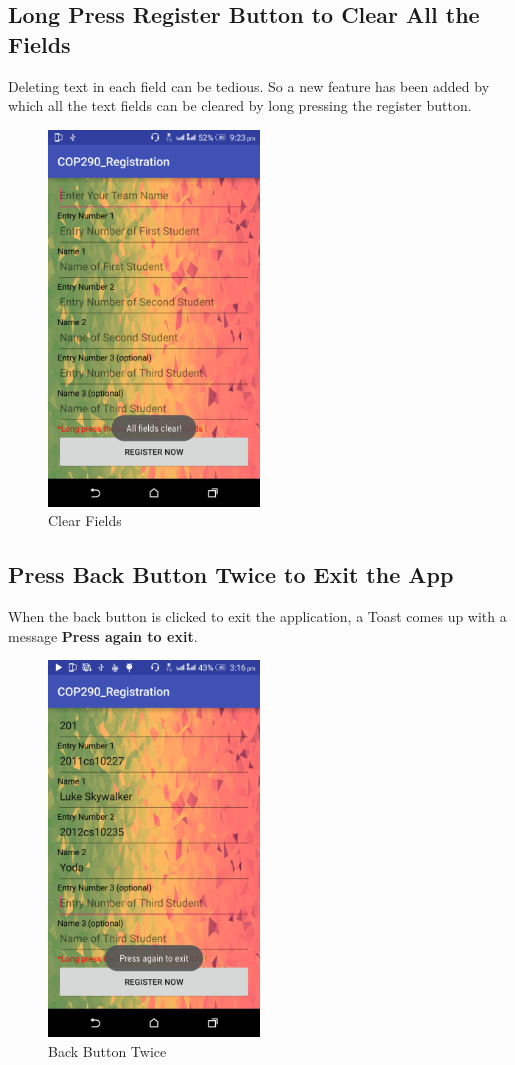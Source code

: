 \documentclass[12pt]{article}
\begin{document}
\subsection{Long Press Register Button to Clear All the Fields}
Deleting text in each field can be tedious. So a new feature has been added by which all the text fields can be cleared by long pressing the register button\cite{Clearall}.
\begin{figure}[!ht]
	\centering
	\includegraphics[width=0.5\textwidth]{images/clear.png}
	\caption{Clear Fields}
\end{figure}
\FloatBarrier  
\subsection{Press Back Button Twice to Exit the App}
When the back button is clicked to exit the application, a Toast comes up with a message \textbf{Press again to exit}\cite{Twice}.
\begin{figure}[!ht]
	\centering
	\includegraphics[width=0.5\textwidth]{images/back.png}
	\caption{Back Button Twice}
\end{figure}
\FloatBarrier
\end{document}
